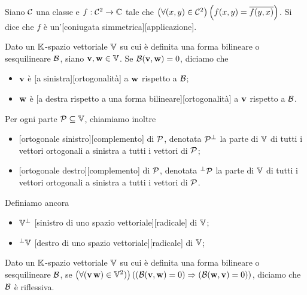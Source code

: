 \begin{Definition}
	Siano $\mathcal{C}$ una classe e $f: \mathcal{C}^2 \rightarrow \mathbb{C}$ tale che $\left ( \forall (x,y) \in \mathcal{C}^2 \right ) \left ( f(x,y) = \overline{f(y,x)} \right )$. Si dice che $f$ \`e un'[coniugata simmetrica][applicazione].
\end{Definition}
\begin{Definition}
	Dato un $\mathbb{K}$-spazio vettoriale $\mathbb{V}$ su cui \`e definita una forma bilineare o sesquilineare $\mathcal{B}$, siano $\mathbf{v}, \mathbf{w} \in \mathbb{V}$. Se $\mathcal{B}(\mathbf{v},\mathbf{w}) = 0$, diciamo che
	\begin{itemize}
		\item $\mathbf{v}$ \`e [a sinistra][ortogonalit\`a] a $\mathbf{w}$ rispetto a $\mathcal{B}$;
		\item $\mathbf{w}$ \`e [a destra rispetto a una forma bilineare][ortogonalit\`a] a $\mathbf{v}$ rispetto a $\mathcal{B}$.
	\end{itemize}
	Per ogni parte $\mathcal{P} \subseteq \mathbb{V}$, chiamiamo inoltre
	\begin{itemize}
		\item {}[ortogonale sinistro][complemento] di $\mathcal{P}$, denotata ${\mathcal{P}}^\perp$ la parte di $\mathbb{V}$ di tutti i vettori ortogonali a sinistra a tutti i vettori di $\mathcal{P}$;
		\item {}[ortogonale destro][complemento] di $\mathcal{P}$, denotata ${}^\perp \mathcal{P}$ la parte di $\mathbb{V}$ di tutti i vettori ortogonali a sinistra a tutti i vettori di $\mathcal{P}$.
	\end{itemize}
	Definiamo ancora
	\begin{itemize}
		\item ${\mathbb{V}}^\perp$ [sinistro di uno spazio vettoriale][radicale] di $\mathbb{V}$;
		\item ${}^\perp \mathbb{V}$ [destro di uno spazio vettoriale][radicale] di $\mathbb{V}$;
	\end{itemize}
\end{Definition}
\begin{Definition}
	Dato un $\mathbb{K}$-spazio vettoriale $\mathbb{V}$ su cui \`e definita una forma bilineare o sesquilineare $\mathcal{B}$, se $\left ( \forall (\mathbf{v}\,\mathbf{w}) \in \mathbb{V}^2) \right ) \left ( \left ( \mathcal{B}(\mathbf{v},\mathbf{w}) = 0 \right ) \Rightarrow \left ( \mathcal{B}(\mathbf{w},\mathbf{v}) = 0 \right ) \right )$, diciamo che $\mathcal{B}$ \`e riflessiva.
\end{Definition}
